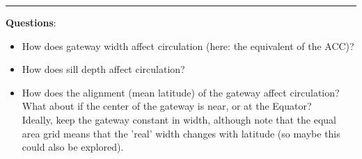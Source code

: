 \vspace{1mm}\noindent\rule{4cm}{0.5pt}\vspace{2mm}

\noindent \textbf{Questions}:

\begin{itemize}
\vspace{1mm}
\item How does gateway width affect circulation (here: the equivalent of the ACC)?
\vspace{1mm}
\item How does sill depth affect circulation?
\vspace{1mm}
\item How does the alignment (mean latitude) of the gateway affect circulation? What about if the center of the gateway is near, or at the Equator?
\\Ideally, keep the gateway constant in width, although note that the equal area grid means that the 'real' width changes with latitude (so maybe this could also be explored).

\end{itemize}

